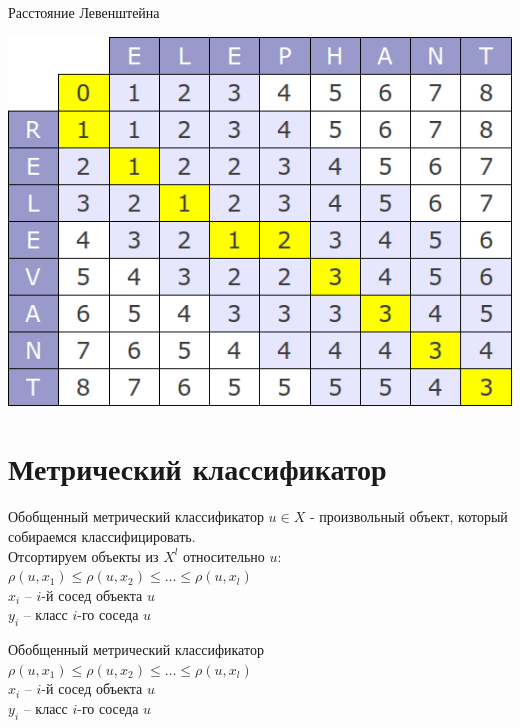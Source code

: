 \documentclass[10pt]{beamer}
\begin{document}
\begin{frame}{Расстояние Левенштейна}
	\begin{center}
	  \includegraphics[width=\textwidth]{images/levenshtein}
	\end{center}
\end{frame}

\section{Метрический классификатор}

\begin{frame}{Обобщенный метрический классификатор}
	$u \in X$ - произвольный объект, который собираемся классифицировать.\\
	\bigbreak
	\pause
	Отсортируем объекты из $X^l$ относительно $u$:
	${\rho(u, x_1) \leq \rho(u, x_2) \leq \dots \leq \rho(u, x_l)}$\\
	\bigbreak
	${x_i}$ -- $i$-й сосед объекта $u$\\
	${y_i}$ -- класс $i$-го соседа $u$
\end{frame}

\begin{frame}{Обобщенный метрический классификатор}
	${\rho(u, x_1) \leq \rho(u, x_2) \leq \dots \leq \rho(u, x_l)}$\\
	\bigbreak
	${x_i}$ -- $i$-й сосед объекта $u$\\
	${y_i}$ -- класс $i$-го соседа $u$
  \bigbreak
\end{frame}
\end{document}
